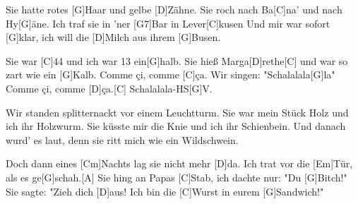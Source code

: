 

\begin{guitar}
	Sie hatte rotes [G]Haar und gelbe [D]Zähne.
	Sie roch nach Ba[C]na' und nach Hy[G]{ä}ne.
	Ich traf sie in 'ner [G7]Bar in Lever[C]kusen
	Und mir war sofort [G]klar, ich will die [D]Milch aus ihrem [G]Busen.
	
	\begin{highlightbar}
		Sie war [C]44 und ich war 13 ein[G]halb.
		Sie hieß Marga[D]rethe[C] und war so zart wie ein [G]Kalb.
		Comme çi, comme [C]{ç}a. Wir singen: "Schalalala[G]la"
		Comme çi, comme [D]{ç}a.[C] Schalalala-HS[G]V.
	\end{highlightbar}
	
	\songsection{Strophe 2}
	Wir standen splitternackt vor einem Leuchtturm.
	Sie war mein Stück Holz und ich ihr Holzwurm.
	Sie küsste mir die Knie und ich ihr Schienbein.
	Und danach wurd' es laut, denn sie ritt mich wie ein Wildschwein.
	
	\begin{highlightbar}
		 \songsnippet{Sie war 44 und ich war 13 einhalb. ...}
	\end{highlightbar}
	
	\songsection{Bridge}
	Doch dann eines [Cm]Nachts lag sie nicht mehr [D]da.
	Ich trat vor die [Em]Tür, als es ge[G]schah.[A]{}
	Sie hing an Papas [C]Stab, ich dachte nur: "Du [G]Bitch!"
	Sie sagte: "Zieh dich [D]aus! Ich bin die [C]Wurst in eurem [G]Sandwich!"
	
	\begin{highlightbar}
		  \optionalChord{(x2)}
	\end{highlightbar}
\end{guitar}